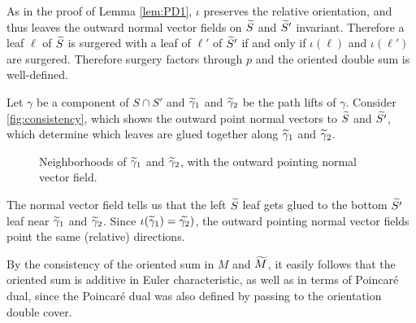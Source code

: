 As in the proof of Lemma \ref{lem:PD1}, $\iota$ preserves the relative orientation, and thus leaves the outward
normal vector fields on $\widetilde{S}$ and $\widetilde{S}'$ invariant. Therefore a leaf $\ell$ of $\widetilde{S}$ is surgered with a leaf of $\ell'$ of $\widetilde{S}'$ if and only if $\iota(\ell)$ and $\iota(\ell')$ are surgered.  Therefore surgery factors through $p$ and the oriented double sum is well-defined.  %

 Let $\gamma$ be a component of $S\cap S'$ and $\widetilde{\gamma}_1$ and $\widetilde{\gamma}_2$ be the path lifts of $\gamma$.  Consider
\autoref{fig:consistency}, which shows the outward point normal vectors to $\widetilde{S}$ and $\widetilde{S'}$,
which determine which leaves are glued together along $\widetilde{\gamma}_1$ and $\widetilde{\gamma}_2$.
\begin{figure}
  \centering
  \caption{Neighborhoods of $\widetilde{\gamma}_1$ and $\widetilde{\gamma}_2$, with the outward pointing normal vector field.}
  \label{fig:consistency}
\end{figure}

The normal vector field tells us that the left $\widetilde{S}$ leaf gets glued to the bottom $\widetilde{S'}$
leaf near $\widetilde{\gamma}_1$ and $\widetilde{\gamma}_2$. Since $\iota(\widetilde{\gamma}_1)=\widetilde{\gamma_2})$, the outward pointing normal vector fields point the same (relative) directions.  %


 By the consistency of the oriented sum in $M$ and $\widetilde{M}$, it easily follows that the oriented sum
is additive in Euler characteristic, as well as in terms of Poincar\'e dual, since the Poincar\'e
dual was also defined by passing to the orientation double cover.


